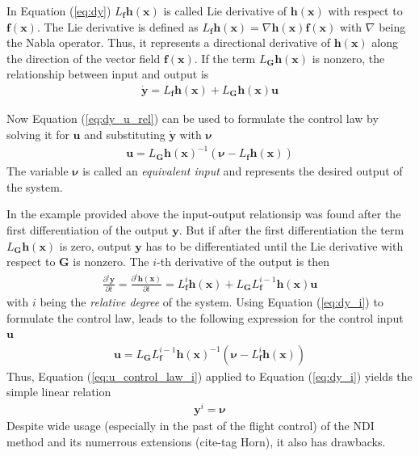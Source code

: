 \documentclass[11pt, a4paper, twoside]{report}
\begin{document}
In Equation (\ref{eq:dy}) $L_{\bm{f}} \bm{h(x)}$ is called Lie derivative of $\bm{h(x)}$ with respect to $\bm{f(x)}$. The Lie derivative is defined as $L_{\bm{f}} \bm{h(x)} = \nabla\bm{h(x)} \bm{f(x)}$ with $\nabla$ being the Nabla operator. Thus, it represents a directional derivative of $\bm{h(x)}$ along the direction of the vector field $\bm{f(x)}$. If the term $L_{\bm{G}} \bm{h(x)}$ is nonzero, the relationship between input and output is
\begin{equation}
	\begin{split}
		\dot{\bm{y}} = L_{\bm{f}} \bm{h(x)} + L_{\bm{G}} \bm{h(x) u} 
		\label{eq:dy_u_rel}
	\end{split}
\end{equation}

Now Equation (\ref{eq:dy_u_rel}) can be used to formulate the control law by solving it for $\bm{u}$ and substituting $\dot{\bm{y}}$ with $\bm{\nu}$
\begin{equation}
	\begin{split}
		\bm{u} = L_{\bm{G}}\bm{h(x)}^{-1} (\bm{\nu} - L_{\bm{f}}\bm{h(x)})
		\label{eq:u_control_law}
	\end{split}
\end{equation}
The variable $\bm{\nu}$ is called an \textit{equivalent input} and represents the desired output of the system. 

In the example provided above the input-output relationsip was found after the first differentiation of the output $\bm{y}$. But if after the first differentiation the term $L_{\bm{G}}\bm{h(x)}$ is zero, output $\bm{y}$ has to be differentiated until the Lie derivative with respect to $\bm{G}$ is nonzero. The $i$-th derivative of the output is then
\begin{equation}
	\begin{split}
		\frac{\partial^i\bm{y}}{\partial t} = \frac{\partial^i\bm{h(x)}}{\partial t} = L_{\bm{f}}^i \bm{h(x)} + L_{\bm{G}} L_{\bm{f}}^{i-1} \bm{h(x) u}
		\label{eq:dy_i}
	\end{split}
\end{equation}
with $i$ being the \textit{relative degree} of the system. Using Equation (\ref{eq:dy_i}) to formulate the control law, leads to the following expression for the control input $\bm{u}$
\begin{equation}
	\begin{split}
		\bm{u} = L_{\bm{G}} L_{\bm{f}}^{i-1} \bm{h(x)}^{-1} (\bm{\nu} - L_{\bm{f}}^i\bm{h(x)}) 
		\label{eq:u_control_law_i}
	\end{split}
\end{equation}
Thus, Equation (\ref{eq:u_control_law_i}) applied to Equation (\ref{eq:dy_i}) yields the simple linear relation
\begin{equation}
	\begin{split}
		\bm{y}^i = \bm{\nu}
		\label{eq:u_control_law_i}
	\end{split}
\end{equation}
Despite wide usage (especially in the past of the flight control) of the \acrshort{NDI} method and its numerrous extensions (cite-tag Horn), it also has drawbacks. 
\end{document}
